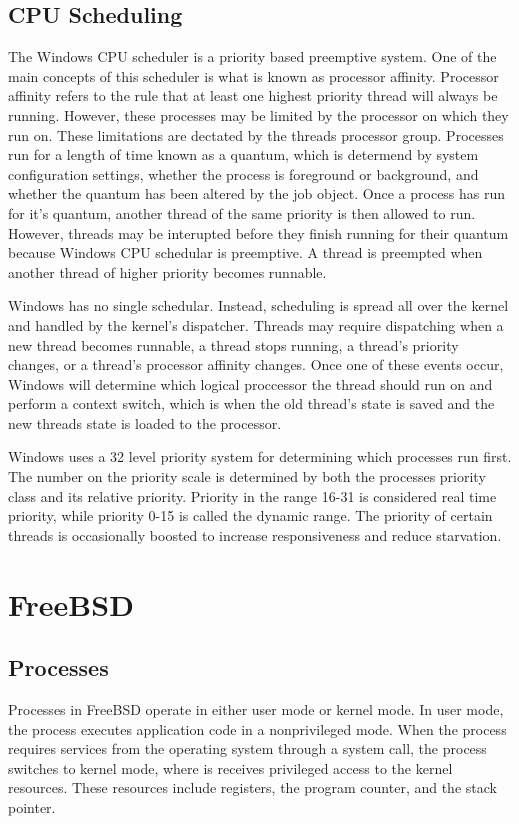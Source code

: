 \documentclass[journal,letterpaper,draftclsnofoot,onecolumn,10pt]{IEEEtran}
\begin{document}
\subsection{CPU Scheduling}
The Windows CPU scheduler is a priority based preemptive system. One of the main concepts of this scheduler is what is known as processor affinity. Processor affinity refers to the rule that at least one highest priority thread will always be running. However, these processes may be limited by the processor on which they run on. These limitations are dectated by the threads processor group. Processes run for a length of time known as a quantum, which is determend by system configuration settings, whether the process is foreground or background, and whether the quantum has been altered by the job object. Once a process has run for it's quantum, another thread of the same priority is then allowed to run. However, threads may be interupted before they finish running for their quantum because Windows CPU schedular is preemptive. A thread is preempted when another thread of higher priority becomes runnable.\cite{1ris12}

Windows has no single schedular. Instead, scheduling is spread all over the kernel and handled by the kernel's dispatcher. Threads may require dispatching when a new thread becomes runnable, a thread stops running, a thread's priority changes, or a thread's processor affinity changes. Once one of these events occur, Windows will determine which logical proccessor the thread should run on and perform a context switch, which is when the old thread's state is saved and the new threads state is loaded to the processor.\cite{1ris12}

Windows uses a 32 level priority system for determining which processes run first. The number on the priority scale is determined by both the processes priority class and its relative priority. Priority in the range 16-31 is considered real time priority, while priority 0-15 is called the dynamic range. The priority of certain threads is occasionally boosted to increase responsiveness and reduce starvation.\cite{1ris12}

\section{FreeBSD}

\subsection{Processes}
Processes in FreeBSD operate in either user mode or kernel mode. In user mode, the process executes application code in a nonprivileged mode. When the process requires services from the operating system through a system call, the process switches to kernel mode, where is receives privileged access to the kernel resources. These resources include registers, the program counter, and the stack pointer.
\end{document}
